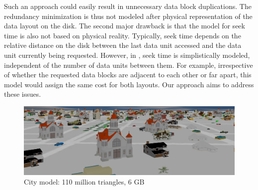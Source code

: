 Such an approach could easily result in unnecessary data
block duplications. The redundancy minimization is thus not modeled after
physical representation of the data layout on the disk. The second major
drawback is that the model for seek time is also not based on physical reality.
Typically, seek time depends on the relative distance on the disk between the
last data unit accessed and the data unit currently being requested. However,
in \cite{optimizingredundancy}, seek time is simplistically modeled,
independent of the number of data units between them. For example,
irrespective of whether the requested data blocks are adjacent to
each other or far apart, this model would assign the same cost for both
layouts. Our approach
aims to address these issues. 


\begin{figure}[t]
  \centering
  \includegraphics[width=\columnwidth]{city.png}
  \caption{City model: 110 million triangles, 6 GB }
  \label{fig:model1}
\end{figure}


